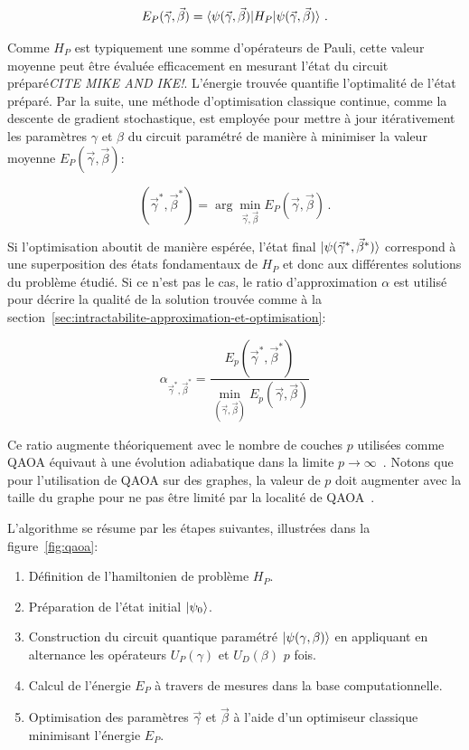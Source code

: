 \begin{equation}
    E_{P} (\vec{\gamma}, \vec{\beta}) = \braket{ \psi(\vec{\gamma}, \vec{\beta}) | H_{P} | \psi(\vec{\gamma}, \vec{\beta}) } \,.
\end{equation}

Comme $H_{P}$ est typiquement une somme d'opérateurs de Pauli, cette valeur moyenne peut être évaluée efficacement en mesurant l'état du circuit préparé\textcolor{mydarkred}{\textit{CITE MIKE AND IKE!}}. L'énergie trouvée quantifie l'optimalité de l'état préparé. Par la suite, une méthode d'optimisation classique continue, comme la descente de gradient stochastique, est employée pour mettre à jour itérativement les paramètres $\gamma$ et $\beta$ du circuit paramétré de manière à minimiser la valeur moyenne $E_{P} (\vec{\gamma}, \vec{\beta})$:

\begin{equation}
    (\vec{\gamma}^{*}, \vec{\beta}^{*}) = \arg \min_{{\vec{\gamma}, \vec{\beta}}} E_{P}(\vec{\gamma}, \vec{\beta}) \,.
\end{equation}

Si l'optimisation aboutit de manière espérée, l'état final $\ket{\psi(\vec{\gamma}^{*}, \vec{\beta}^{*})}$ correspond à une superposition des états fondamentaux de $H_{P}$ et donc aux différentes solutions du problème étudié. Si ce n'est pas le cas, le ratio d'approximation $\alpha$ est utilisé pour décrire la qualité de la solution trouvée comme à la section~\ref{sec:intractabilite-approximation-et-optimisation}:

\begin{equation}
    \alpha_{\vec{\gamma}^{*}, \vec{\beta}^{*}} = \frac{ E_{p} (\vec{\gamma}^{*}, \vec{\beta}^{*})}{\min_{(\vec{\gamma}, \vec{\beta})} E_{p} (\vec{\gamma}, \vec{\beta}) }
\end{equation}

Ce ratio augmente théoriquement avec le nombre de couches $p$ utilisées comme QAOA équivaut à une évolution adiabatique dans la limite $p \to \infty$~\cite{farhiQuantumApproximateOptimization2014}. Notons que pour l'utilisation de QAOA sur des graphes, la valeur de $p$ doit augmenter avec la taille du graphe pour ne pas être limité par la localité de QAOA~\cite{farhiQuantumApproximateOptimization2020}.

L'algorithme se résume par les étapes suivantes, illustrées dans la figure~\ref{fig:qaoa}:

\begin{enumerate}[(1)]
    \item Définition de l'hamiltonien de problème $H_{P}$.
    \item Préparation de l'état initial $\ket{\psi_{0}}$.
    \item Construction du circuit quantique paramétré $\ket{\psi(\gamma, \beta)}$ en appliquant en alternance les opérateurs $U_{P}(\gamma)$ et $U_{D}(\beta)$ $p$ fois.
    \item Calcul de l'énergie $E_{P}$ à travers de mesures dans la base computationnelle.
    \item Optimisation des paramètres $\vec{\gamma}$ et $\vec{\beta}$ à l'aide d'un optimiseur classique minimisant l'énergie $E_{P}$.
\end{enumerate}


